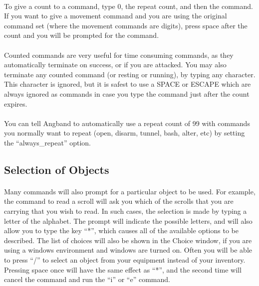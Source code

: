 \paragraph{}To give a count to a command, type 0, the repeat count, and then
the command. If you want to give a movement command and you are using the
original command set (where the movement commands are digits), press space
after the count and you will be prompted for the command.
 
\paragraph{}Counted commands are very useful for time consuming commands, as
they automatically terminate on success, or if you are attacked. You may
also terminate any counted command (or resting or running), by typing any
character. This character is ignored, but it is safest to use a SPACE or
ESCAPE which are always ignored as commands in case you type the command
just after the count expires.

\paragraph{}You can tell Angband to automatically use a repeat count of 99
with commands you normally want to repeat (open, disarm, tunnel, bash,
alter, etc) by setting the ``always\_repeat'' option.
 
 
\subsection{Selection of Objects}
\paragraph{}Many commands will also prompt for a particular object to be used.
For example, the command to read a scroll will ask you which of the
scrolls that you are carrying that you wish to read. In such cases, the
selection is made by typing a letter of the alphabet. The prompt will
indicate the possible letters, and will also allow you to type the key
``*'', which causes all of the available options to be described. The list
of choices will also be shown in the Choice window, if you are using a
windows environment and windows are turned on. Often you will be able to
press ``/'' to select an object from your equipment instead of your
inventory. Pressing space once will have the same effect as ``*'', and
the second time will cancel the command and run the ``i'' or ``e'' command.
 
